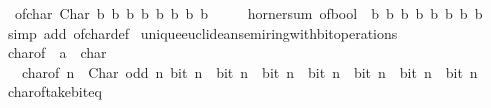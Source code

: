 \begin{isabellebody}
\ \ {\isacartoucheopen}of{\isacharunderscore}{\kern0pt}char\ {\isacharparenleft}{\kern0pt}Char\ b{}\ b{}\ b{}\ b{}\ b{}\ b{}\ b{}\ b{}{\isacharparenright}{\kern0pt}\ {\isacharequal}{\kern0pt}\isanewline
\ \ \ \ horner{\isacharunderscore}{\kern0pt}sum\ of{\isacharunderscore}{\kern0pt}bool\ {}\ {\isacharbrackleft}{\kern0pt}b{}{\isacharcomma}{\kern0pt}\ b{}{\isacharcomma}{\kern0pt}\ b{}{\isacharcomma}{\kern0pt}\ b{}{\isacharcomma}{\kern0pt}\ b{}{\isacharcomma}{\kern0pt}\ b{}{\isacharcomma}{\kern0pt}\ b{}{\isacharcomma}{\kern0pt}\ b{}{\isacharbrackright}{\kern0pt}{\isacartoucheclose}\isanewline
%
\isadelimproof
\ \ %
\endisadelimproof
%
\isatagproof
{}\isamarkupfalse%
\ {\isacharparenleft}{\kern0pt}simp\ add{\isacharcolon}{\kern0pt}\ of{\isacharunderscore}{\kern0pt}char{\isacharunderscore}{\kern0pt}def{\isacharparenright}{\kern0pt}%
\endisatagproof
{\isafoldproof}%
%
\isadelimproof
\isanewline
%
\endisadelimproof
\isanewline
{}\isamarkupfalse%
\isanewline
\isanewline
{}\isamarkupfalse%
\ unique{\isacharunderscore}{\kern0pt}euclidean{\isacharunderscore}{\kern0pt}semiring{\isacharunderscore}{\kern0pt}with{\isacharunderscore}{\kern0pt}bit{\isacharunderscore}{\kern0pt}operations\isanewline
{}\isanewline
\isanewline
{}\isamarkupfalse%
\ char{\isacharunderscore}{\kern0pt}of\ {\isacharcolon}{\kern0pt}{\isacharcolon}{\kern0pt}\ {\isacartoucheopen}{\isacharprime}{\kern0pt}a\ {\isasymRightarrow}\ char{\isacartoucheclose}\isanewline
\ \ \ {\isacartoucheopen}char{\isacharunderscore}{\kern0pt}of\ n\ {\isacharequal}{\kern0pt}\ Char\ {\isacharparenleft}{\kern0pt}odd\ n{\isacharparenright}{\kern0pt}\ {\isacharparenleft}{\kern0pt}bit\ n\ {}{\isacharparenright}{\kern0pt}\ {\isacharparenleft}{\kern0pt}bit\ n\ {}{\isacharparenright}{\kern0pt}\ {\isacharparenleft}{\kern0pt}bit\ n\ {}{\isacharparenright}{\kern0pt}\ {\isacharparenleft}{\kern0pt}bit\ n\ {}{\isacharparenright}{\kern0pt}\ {\isacharparenleft}{\kern0pt}bit\ n\ {}{\isacharparenright}{\kern0pt}\ {\isacharparenleft}{\kern0pt}bit\ n\ {}{\isacharparenright}{\kern0pt}\ {\isacharparenleft}{\kern0pt}bit\ n\ {}{\isacharparenright}{\kern0pt}{\isacartoucheclose}\isanewline
\isanewline
{}\isamarkupfalse%
\ char{\isacharunderscore}{\kern0pt}of{\isacharunderscore}{\kern0pt}take{\isacharunderscore}{\kern0pt}bit{\isacharunderscore}{\kern0pt}eq{\isacharcolon}{\kern0pt}\isanewline

\end{isabellebody}
